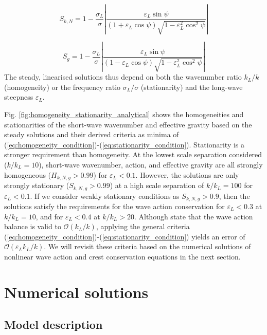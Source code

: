 \documentclass[lineno]{jfm}
\begin{document}
\begin{equation}
  S_{k,N} = 1 - \frac{\sigma_L}{\sigma} \left| \frac{\varepsilon_L \sin{\psi}}{\left(1 + \varepsilon_L \cos{\psi}\right) \sqrt{1 - \varepsilon_L^2 \cos^2{\psi}}} \right|
  \label{eq:stationarity_k}
\end{equation}

\begin{equation}
  S_{g} = 1 - \frac{\sigma_L}{\sigma} \left| \frac{\varepsilon_L \sin{\psi}}{\left(1 - \varepsilon_L \cos{\psi}\right) \sqrt{1 - \varepsilon_L^2 \cos^2{\psi}}} \right|
  \label{eq:stationarity_g}
\end{equation}
The steady, linearised solutions thus depend on both the wavenumber ratio
$k_L/k$ (homogeneity) or the frequency ratio $\sigma_L/\sigma$ (stationarity)
and the long-wave steepness $\varepsilon_L$.

Fig. \ref{fig:homogeneity_stationarity_analytical} shows the homogeneities and
stationarities of the short-wave wavenumber and effective gravity based on
the steady solutions and their derived criteria as minima of
(\ref{eq:homogeneity_condition})-(\ref{eq:stationarity_condition}).
Stationarity is a stronger requirement than homogeneity.
At the lowest scale separation considered ($k/k_L = 10$), short-wave wavenumber,
action, and effective gravity are all strongly homogeneous ($H_{k,N,g} > 0.99$)
for $\varepsilon_L < 0.1$.
However, the solutions are only strongly stationary ($S_{k,N,g} > 0.99$) at a
high scale separation of $k/k_L = 100$ for $\varepsilon_L < 0.1$.
If we consider weakly stationary conditions as $S_{k,N,g} > 0.9$, then the
solutions satisfy the requirements for the wave action conservation for
$\varepsilon_L < 0.3$ at $k/k_L = 10$, and for $\varepsilon_L < 0.4$ at
$k/k_L > 20$.
Although \citet{bretherton1968wavetrains} state that the wave action balance
is valid to $\mathcal{O}(k_L/k)$, applying the general criteria
(\ref{eq:homogeneity_condition})-(\ref{eq:stationarity_condition}) yields an
error of $\mathcal{O}(\varepsilon_L k_L/k)$.
We will revisit these criteria based on the numerical solutions of nonlinear
wave action and crest conservation equations in the next section.

\section{Numerical solutions}
\label{section:numerical_solutions}

\subsection{Model description}
\end{document}
